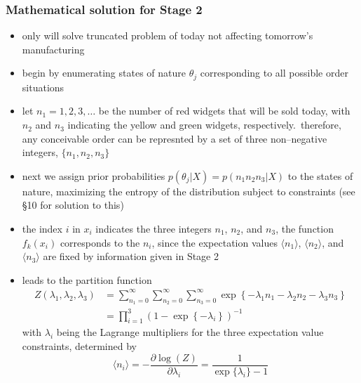 \documentclass[../jaynes_prob_theory_notes.tex]{subfiles}
\begin{document}
                \subsubsection{Mathematical solution for Stage 2}
                    \begin{itemize} 
                        \item only will solve truncated problem of today not affecting tomorrow's manufacturing
                        \item begin by enumerating states of nature \(\theta_j\) corresponding to all possible order situations
                        \item let \(n_1 = 1, 2, 3, \ldots\) be the number of red widgets that will be sold today, with \(n_2\) and \(n_3\) indicating the yellow and green widgets, respectively.\ therefore, any conceivable order can be represnted by a set of three non--negative integers, \(\{n_1, n_2, n_3\}\)
                        \item next we assign prior probabilities \(p(\theta_j | X) = p(n_1 n_2 n_3|X)\) to the states of nature, maximizing the entropy of the distribution subject to constraints (see \S 10 for solution to this)
                        \item the index \(i\) in \(x_i\) indicates the three integers \(n_1\), \(n_2\), and \(n_3\), the function \(f_k(x_i)\) corresponds to the \(n_i\), since the expectation values \(\langle n_1 \rangle\), \(\langle n_2 \rangle\), and \(\langle n_3 \rangle\) are fixed by information given in Stage 2
                        \item leads to the partition function
                            \begin{align*} 
                                Z(\lambda_1, \lambda_2, \lambda_3) &= \sum\limits^{\infty}_{n_1 = 0} \sum\limits^{\infty}_{n_2 = 0} \sum\limits^{\infty}_{n_3 = 0} \exp \left \{ -\lambda_1 n_1 - \lambda_2 n_2 - \lambda_3 n_3 \right \} \\
                                                                   &= \prod\limits^{3}_{i=1} {\left(1 - \exp \left \{-\lambda_i \right \} \right)}^{-1}
                            \end{align*}
                            with \(\lambda_i\) being the Lagrange multipliers for the three expectation value constraints, determined by
                            \begin{equation*} 
                                \langle n_i \rangle = -\frac{\partial \log(Z)}{\partial \lambda_i} = \frac{1}{\exp \{\lambda_i\} - 1}

\end{equation*}
\end{itemize}
\end{document}
